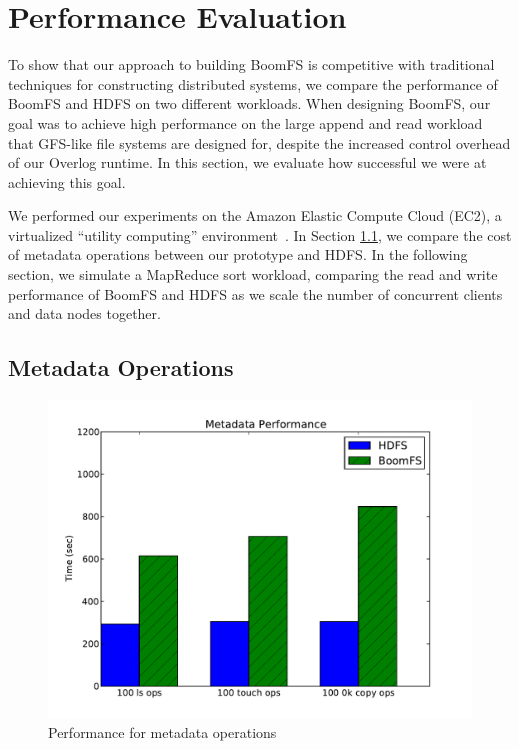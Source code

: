 \documentclass[twocolumn]{article}
\begin{document}
\section{Performance Evaluation}
\label{perf-eval}
To show that our approach to building BoomFS is competitive with
traditional techniques for constructing distributed systems, we
compare the performance of BoomFS and HDFS on two different
workloads. When designing BoomFS, our goal was to achieve high
performance on the large append and read workload that GFS-like file
systems are designed for, despite the increased control overhead of
our Overlog runtime.  In this section, we evaluate how successful we
were at achieving this goal.

We performed our experiments on the Amazon Elastic Compute Cloud
(EC2), a virtualized ``utility computing''
environment~\cite{amazon-ec2}. In Section \ref{metadata-perf-eval}, we
compare the cost of metadata operations between our prototype and
HDFS.  In the following section, we simulate a MapReduce sort
workload, comparing the read and write performance of BoomFS and HDFS
as we scale the number of concurrent clients and data nodes together.

\subsection{Metadata Operations}
\label{metadata-perf-eval}
\begin{figure}
\centering
\includegraphics[width=1\columnwidth]{figures/metadata_throughput.pdf}
\caption{Performance for metadata operations}
\label{fig:metadata-perf}
\end{figure}
\end{document}
